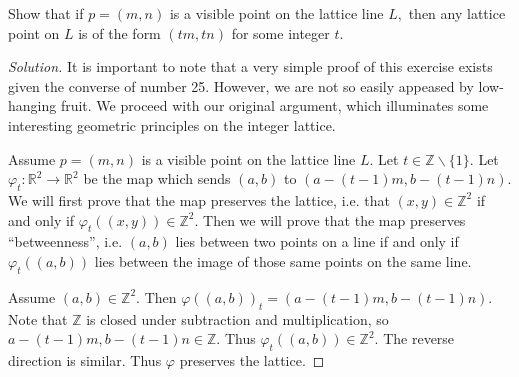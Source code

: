 \documentclass[12pt]{article}
\newcommand{\Z}{\mathbb{Z}}
\newcommand{\R}{\mathbb{R}}
\newenvironment{exercise}[2][Exercise]{\begin{trivlist}
        \item[\hskip \labelsep {\bfseries #1}\hskip \labelsep {\bfseries #2.}]}{\end{trivlist}}
\newenvironment{solution}
        {\begin{proof}[Solution]}
                    {\end{proof}}
\begin{document}
\begin{exercise}{26}
    Show that if \( p = ( m,n ) \) is a visible point on the lattice line \( L, \) then any lattice point on \( L \) is of the form \( ( tm,tn ) \) for some integer \( t. \)
    \begin{solution}
        It is important to note that a very simple proof of this exercise exists given the converse of number 25. However, we are not so easily appeased by low-hanging fruit. We proceed with our original argument, which illuminates some interesting geometric principles on the integer lattice.
        
        Assume \( p = ( m,n ) \) is a visible point on the lattice line \( L. \) Let \( t \in \Z \backslash \{ 1 \} . \) Let \( \varphi_{t}  : \R^{2} \to \R^{2} \) be the map which sends \( ( a,b ) \) to \( ( a - (t-1)m ,b - (t-1)n)  \). We will first prove that the map preserves the lattice, i.e. that \( ( x,y ) \in \Z^{2} \) if and only if \( \varphi_{t}(( x,y )) \in \Z^{2}  \). Then we will prove that the map preserves ``betweenness'', i.e. \( ( a,b ) \) lies between two points on a line if and only if \( \varphi_{t} (( a,b )) \) lies between the image of those same points on the same line.
        
        Assume \( ( a,b ) \in \Z^{2} . \) Then \( \varphi(( a,b ))_{t}  = ( a - (t-1)m, b-(t-1)n ) . \) Note that \( \Z \) is closed under subtraction and multiplication, so \( a-(t-1)m, b-(t-1)n \in \Z. \) Thus \( \varphi_{t} (( a,b )) \in \Z^{2} . \) The reverse direction is similar. Thus \( \varphi \) preserves the lattice.
        

\end{solution}
\end{exercise}
\end{document}
